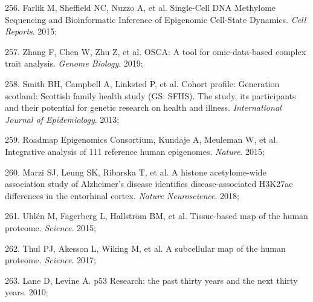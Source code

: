 \documentclass[11pt,oneside]{bristolthesis}
\newenvironment{cslreferences}%
  {}%
  {\par}
\begin{document}
\begin{cslreferences}
\leavevmode\hypertarget{ref-Farlik2015}{}%
256. Farlik M, Sheffield NC, Nuzzo A, et al. Single-Cell DNA Methylome Sequencing and Bioinformatic Inference of Epigenomic Cell-State Dynamics. \emph{Cell Reports}. 2015;

\leavevmode\hypertarget{ref-Zhang2019}{}%
257. Zhang F, Chen W, Zhu Z, et al. OSCA: A tool for omic-data-based complex trait analysis. \emph{Genome Biology}. 2019;

\leavevmode\hypertarget{ref-Smith2013}{}%
258. Smith BH, Campbell A, Linksted P, et al. Cohort profile: Generation scotland: Scottish family health study (GS: SFHS). The study, its participants and their potential for genetic research on health and illness. \emph{International Journal of Epidemiology}. 2013;

\leavevmode\hypertarget{ref-RoadmapEpigenomicsConsortium2015}{}%
259. Roadmap Epigenomics Consortium, Kundaje A, Meuleman W, et al. Integrative analysis of 111 reference human epigenomes. \emph{Nature}. 2015;

\leavevmode\hypertarget{ref-Marzi2018}{}%
260. Marzi SJ, Leung SK, Ribarska T, et al. A histone acetylome-wide association study of Alzheimer's disease identifies disease-associated H3K27ac differences in the entorhinal cortex. \emph{Nature Neuroscience}. 2018;

\leavevmode\hypertarget{ref-Uhlen2015}{}%
261. Uhlén M, Fagerberg L, Hallström BM, et al. Tissue-based map of the human proteome. \emph{Science}. 2015;

\leavevmode\hypertarget{ref-Thul2017}{}%
262. Thul PJ, Akesson L, Wiking M, et al. A subcellular map of the human proteome. \emph{Science}. 2017;

\leavevmode\hypertarget{ref-Lane2010}{}%
263. Lane D, Levine A. p53 Research: the past thirty years and the next thirty years. 2010;
\end{cslreferences}
\end{document}
